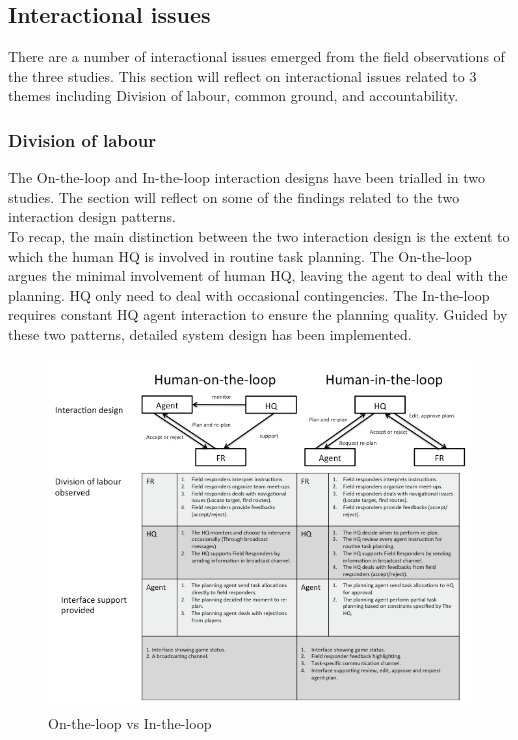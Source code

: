 \subsection{Interactional issues}\label{sec:conclusionIssue}
There are a number of interactional issues emerged from the field observations of the three studies. This section will reflect on interactional issues related to 3 themes including Division of labour, common ground, and accountability.

\subsubsection{Division of labour}\label{sec:conclusionHH}
The On-the-loop and In-the-loop interaction designs have been trialled in two studies. The section will reflect on some of the findings related to the two interaction design patterns. \\

To recap, the main distinction between the two interaction design is the extent to which the human HQ is involved in routine task planning. The On-the-loop  argues the minimal involvement of human HQ, leaving the agent to deal with the planning. HQ only need to deal with occasional contingencies. The In-the-loop requires constant HQ agent interaction to ensure the planning quality. Guided by these two patterns, detailed system design has been implemented.\\

\begin{figure}[h]
  \centering
  \includegraphics[width=1\textwidth]{img/conclusion/huilvshuol}
  \caption{On-the-loop vs In-the-loop}
  \label{fig:huilvshuol}
\end{figure}


